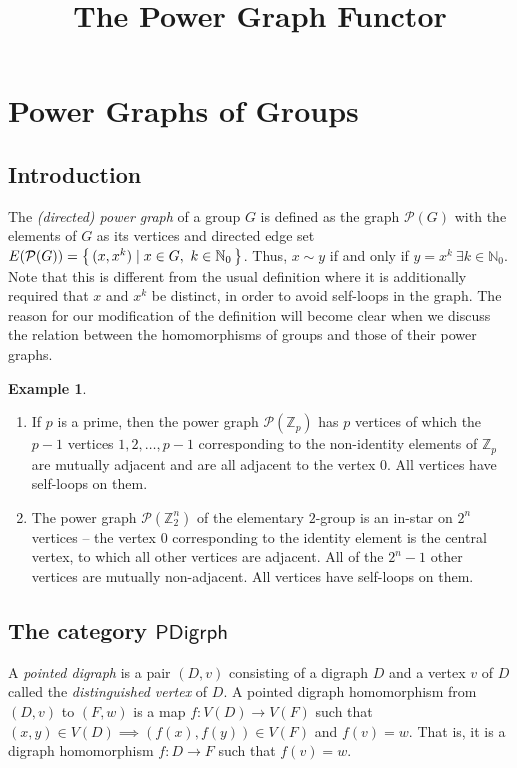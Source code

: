 \documentclass[11pt, a4paper]{article}
\newcommand{\cat}[1]{\mathsf{#1}}
\newcommand{\fun}[1]{\mathcal{#1}}
\theoremstyle{definition}
\newtheorem{Example}[Theorem]{Example}
\begin{document}
\title{The Power Graph Functor}

\author{}
 
\maketitle

\section{Power Graphs of Groups}

\subsection{Introduction}\label{sec:Intro}
The \emph{(directed) power graph} of a group $G$ is defined as the graph $\fun P(G)$ with the elements of $G$ as its vertices and directed edge set $E(\fun P(G)) = \qty{\, (x,x^k) \mid x \in G,\ k \in \mathbb N_0 \,}$. Thus, $x \sim y$ if and only if $y = x^k\ \exists k \in \mathbb N_0$. Note that this is different from the usual definition where it is additionally required that $x$ and $x^k$ be distinct, in order to avoid self-loops in the graph. The reason for our modification of the definition will become clear when we discuss the relation between the homomorphisms of groups and those of their power graphs.

\begin{Example}\mbox{}
\begin{enumerate}
\item If $p$ is a prime, then the power graph $\fun P(\mathbb Z_p)$ has $p$ vertices of which the $p - 1$ vertices $1, 2, \ldots, p - 1$ corresponding to the non-identity elements of $\mathbb Z_p$ are mutually adjacent and are all adjacent to the vertex $0$. All vertices have self-loops on them.

\item The power graph $\fun P(\mathbb Z_2^n)$ of the elementary $2$-group is an in-star on $2^n$ vertices -- the vertex $0$ corresponding to the identity element is the central vertex, to which all other vertices are adjacent. All of the $2^n - 1$ other vertices are mutually non-adjacent. All vertices have self-loops on them.
\end{enumerate}
\end{Example}

\subsection{The category $\cat{PDigrph}$}
A \emph{pointed digraph} is a pair $(D, v)$ consisting of a digraph $D$ and a vertex $v$ of $D$ called the \emph{distinguished vertex} of $D$. A pointed digraph homomorphism from $(D,v)$ to $(F,w)$ is a map $f\colon V(D) \to V(F)$ such that $(x,y) \in V(D) \implies (f(x), f(y)) \in V(F)$ and $f(v) = w$. That is, it is a digraph homomorphism $f\colon D \to F$ such that $f(v) = w$.
\end{document}
